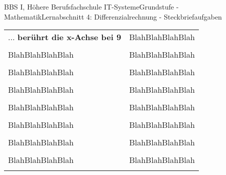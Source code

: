\documentclass[11pt,oneside,openany,headings=optiontotoc,11pt,numbers=noenddot]{article}
\begin{document}
\begin{worksheet}{BBS I, Höhere Berufsfachschule IT-Systeme}{Grundstufe - Mathematik}{Lernabschnitt 4: Differenzialrechnung - Steckbriefaufgaben}
\begin{tabularx}{\textwidth}{|L{5cm}|X|}
			& \\
			\hline
			... \textbf{berührt die x-Achse bei 9} & \color{white}BlahBlahBlahBlah\\
			& \\
			\hline
			\color{white}BlahBlahBlahBlah & \color{white}BlahBlahBlahBlah\\
			& \\
			\hline
			\color{white}BlahBlahBlahBlah & \color{white}BlahBlahBlahBlah\\
			& \\
			\hline
			\color{white}BlahBlahBlahBlah & \color{white}BlahBlahBlahBlah\\
			& \\
			\hline
			\color{white}BlahBlahBlahBlah & \color{white}BlahBlahBlahBlah\\
			& \\
			\hline
			\color{white}BlahBlahBlahBlah & \color{white}BlahBlahBlahBlah\\
			& \\
			\hline
			\color{white}BlahBlahBlahBlah & \color{white}BlahBlahBlahBlah\\
			& \\
			\hline
			\color{white}BlahBlahBlahBlah & \color{white}BlahBlahBlahBlah\\
			& \\
			\hline
		\end{tabularx}
	\end{worksheet}
\end{document}
